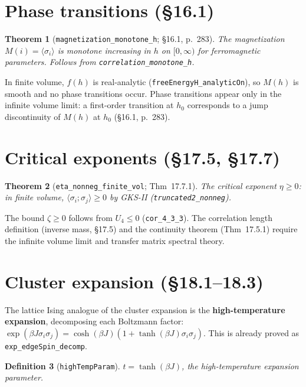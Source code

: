 \documentclass[a4paper,11pt]{article}
\newtheorem{theorem}{Theorem}
\newtheorem{definition}[theorem]{Definition}
\begin{document}
\section{Phase transitions (\S16.1)}

\begin{theorem}[\texttt{magnetization\_monotone\_h}; \S16.1, p.~283]
The magnetization $M(i) = \langle\sigma_i\rangle$ is monotone increasing
in $h$ on $[0, \infty)$ for ferromagnetic parameters.
Follows from \texttt{correlation\_monotone\_h}.
\end{theorem}

In finite volume, $f(h)$ is real-analytic (\texttt{freeEnergyH\_analyticOn}),
so $M(h)$ is smooth and no phase transitions occur.
Phase transitions appear only in the infinite volume limit:
a first-order transition at $h_0$ corresponds to a jump discontinuity
of $M(h)$ at $h_0$ (\S16.1, p.~283).

\section{Critical exponents (\S17.5, \S17.7)}

\begin{theorem}[\texttt{eta\_nonneg\_finite\_vol}; Thm~17.7.1]
The critical exponent $\eta \ge 0$: in finite volume,
$\langle\sigma_i;\sigma_j\rangle \ge 0$ by GKS-II
(\texttt{truncated2\_nonneg}).
\end{theorem}

The bound $\zeta \ge 0$ follows from $U_4 \le 0$ (\texttt{cor\_4\_3\_3}).
The correlation length definition (inverse mass, \S17.5)
and the continuity theorem (Thm~17.5.1) require the infinite
volume limit and transfer matrix spectral theory.

\section{Cluster expansion (\S18.1--18.3)}

The lattice Ising analogue of the cluster expansion is the
\textbf{high-temperature expansion}, decomposing each Boltzmann factor:
$\exp(\beta J \sigma_i\sigma_j) = \cosh(\beta J)(1 + \tanh(\beta J)\sigma_i\sigma_j)$.
This is already proved as \texttt{exp\_edgeSpin\_decomp}.

\begin{definition}[\texttt{highTempParam}]
$t = \tanh(\beta J)$, the high-temperature expansion parameter.
\end{definition}
\end{document}

